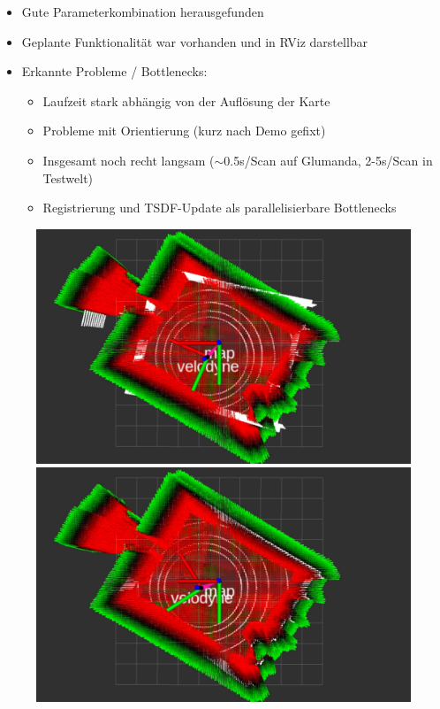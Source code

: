 \documentclass{beamer}
\begin{document}
\begin{frame}{\subsecname}
\begin{itemize}
\item Gute Parameterkombination herausgefunden
\item Geplante Funktionalität war vorhanden und in RViz darstellbar
\item Erkannte Probleme / Bottlenecks:
\begin{itemize}
\item Laufzeit stark abhängig von der Auflösung der Karte
\item Probleme mit Orientierung (kurz nach Demo gefixt)
\item Insgesamt noch recht langsam ($\sim$0.5s/Scan auf Glumanda, 2-5s/Scan in Testwelt)
\item Registrierung und TSDF-Update als parallelisierbare Bottlenecks
\end{itemize}
\end{itemize}
\begin{figure}
    \includegraphics[width=\linewidth]{images/demo1.jpg}
\endminipage\hfill
{}
    \includegraphics[width=\linewidth]{images/demo2.jpg}
\endminipage\hfill
\end{figure}
\end{frame}
\end{document}
